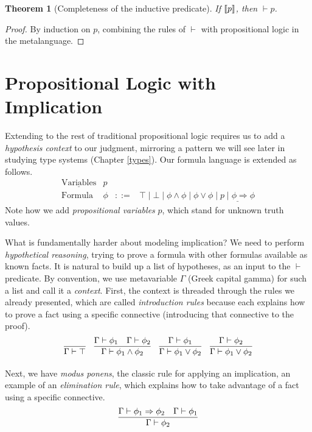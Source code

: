 \documentclass{amsbook}
\newtheorem{theorem}{Theorem}[chapter]
\theoremstyle{definition}
\theoremstyle{remark}
\numberwithin{section}{chapter}
\numberwithin{equation}{chapter}
\begin{document}
\begin{theorem}[Completeness of the inductive predicate]
  If ${\left \llbracket p \right \rrbracket}$, then $\vdash p$.
\end{theorem}
\begin{proof}
  By induction on $p$, combining the rules of $\vdash$ with propositional logic in the metalanguage.
\end{proof}

\section{Propositional Logic with Implication}

Extending to the rest of traditional propositional logic requires us to add a \emph{hypothesis context} to our judgment, mirroring a pattern we will see later in studying type systems (Chapter \ref{types}).
Our formula language is extended as follows.
$$\begin{array}{rrcl}
  \underline{\textrm{Variables}} & p \\
  \textrm{Formula} & \phi &::=& \top \mid \bot \mid \phi \land \phi \mid \phi \lor \phi \mid \underline{p \mid \phi \Rightarrow \phi}
\end{array}$$
Note how we add \emph{propositional variables} $p$, which stand for unknown truth values.

What is fundamentally harder about modeling implication?
We need to perform \emph{hypothetical reasoning}, trying to prove a formula with other formulas available as known facts.
It is natural to build up a list of hypotheses, as an input to the $\vdash$ predicate.
By convention, we use metavariable $\Gamma$ (Greek capital gamma) for such a list and call it a \emph{context}.
First, the context is threaded through the rules we already presented, which are called \emph{introduction rules} because each explains how to prove a fact using a specific connective (introducing that connective to the proof).
$$\infer{\Gamma \vdash \top}{}
\quad \infer{\Gamma \vdash \phi_1 \land \phi_2}{
  \Gamma \vdash \phi_1
  & \Gamma \vdash \phi_2
}
\quad \infer{\Gamma \vdash \phi_1 \lor \phi_2}{
  \Gamma \vdash \phi_1
}
\quad \infer{\Gamma \vdash \phi_1 \lor \phi_2}{
  \Gamma \vdash \phi_2
}$$

Next, we have \emph{modus ponens}, the classic rule for applying an implication, an example of an \emph{elimination rule}, which explains how to take advantage of a fact using a specific connective.
$$\infer{\Gamma \vdash \phi_2}{
  \Gamma \vdash \phi_1 \Rightarrow \phi_2
  & \Gamma \vdash \phi_1
}$$
\end{document}
